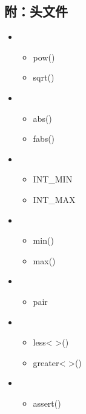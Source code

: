 \documentclass[letterpaper,10pt,english]{sphinxmanual}
\begin{document}
\subsection{附：头文件}
\label{\detokenize{cpp/18_commonFunc:id2}}\begin{itemize}
\item {} 
\begin{itemize}
\item {} 
pow()

\item {} 
sqrt()

\end{itemize}

\item {} 
\begin{itemize}
\item {} 
abs()

\item {} 
fabs()

\end{itemize}

\item {} 
\begin{itemize}
\item {} 
INT\_MIN

\item {} 
INT\_MAX

\end{itemize}

\item {} 
\begin{itemize}
\item {} 
min()

\item {} 
max()

\end{itemize}

\item {} 
\begin{itemize}
\item {} 
pair

\end{itemize}

\item {} 
\begin{itemize}
\item {} 
less\textless{}  \textgreater{}()

\item {} 
greater\textless{}  \textgreater{}()

\end{itemize}

\item {} 
\begin{itemize}
\item {} 
assert()

\end{itemize}

\end{itemize}
\end{document}
